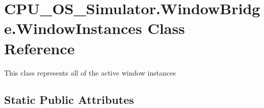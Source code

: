 \hypertarget{class_c_p_u___o_s___simulator_1_1_window_bridge_1_1_window_instances}{}\section{C\+P\+U\+\_\+\+O\+S\+\_\+\+Simulator.\+Window\+Bridge.\+Window\+Instances Class Reference}
\label{class_c_p_u___o_s___simulator_1_1_window_bridge_1_1_window_instances}


This class represents all of the active window instances  


\subsection*{Static Public Attributes}
